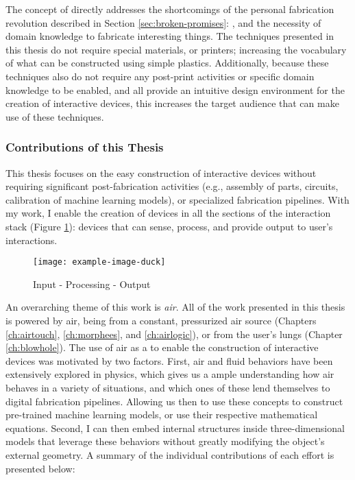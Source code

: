       The concept of \papf directly addresses the shortcomings of the personal
      fabrication revolution described in Section \ref{sec:broken-promises}:
      , and the necessity of
      domain knowledge to fabricate interesting things. The techniques
      presented in this thesis do not require special materials, or printers;
      increasing the vocabulary of what can be constructed using simple
      plastics. Additionally, because these techniques also do not require any
      post-print activities or specific domain knowledge to be enabled, and all
      provide an intuitive design environment for the creation of interactive
      devices, this increases the target audience that can make use of these
      techniques.

      \newpage
      \subsubsection*{Contributions of this Thesis}
        This thesis focuses on the easy construction of interactive devices
        without requiring significant post-fabrication activities (e.g.,
        assembly of parts, circuits, calibration of machine learning models), or
        specialized fabrication pipelines.  With my work, I enable the creation
        of devices in all the sections of the interaction stack (Figure
        \ref{fig:stack}): devices that can sense, process, and provide output to
        user's interactions.

        \begin{figure}[h]
          \centering
          \texttt{[image: example-image-duck]}
          \label{fig:stack}
          \caption{Input - Processing - Output}
        \end{figure}
        
        An overarching theme of this work is \emph{air}. All of the work
        presented in this thesis is powered by air, being from a constant,
        pressurized air source (Chapters \ref{ch:airtouch}, \ref{ch:morphees},
        and \ref{ch:airlogic}), or from the user's lungs (Chapter
        \ref{ch:blowhole}). The use of air as a  to enable the
        construction of interactive devices was motivated by two factors. First,
        air and fluid behaviors have been extensively explored in physics, which
        gives us a ample understanding how air behaves in a variety of
        situations, and which ones of these lend themselves to digital
        fabrication pipelines.  Allowing us then to use these concepts to
        construct pre-trained machine learning models, or use their respective
        mathematical equations. Second, I can then embed internal structures
        inside three-dimensional models that leverage these behaviors without
        greatly modifying the object's external geometry. A summary of the
        individual contributions of each effort is presented below:

